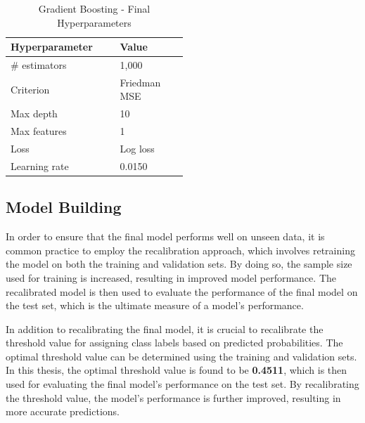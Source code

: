         
        \begin{table}[H]
            \small
            \setlength{\tabcolsep}{8pt}
            \renewcommand{\arraystretch}{1.3}
            \centering
                \caption[Gradient Boosting - Final Hyperparameters]{Gradient Boosting - Final Hyperparameters}\label{tab:finalhyp}
                \begin{tabular}{p{0.25\linewidth}p{0.25\linewidth}}
            \toprule
            \textbf{Hyperparameter} & \textbf{Value}\\
            \midrule
            \hline
            \# estimators & 1,000 \\
            Criterion & Friedman MSE \\
            Max depth & 10 \\
            Max features & 1 \\
            Loss & Log loss \\
            Learning rate &  0.0150 \\
            \hline
            \bottomrule
            \end{tabular}
            \vspace{0.7em}
        
            \vspace{-1em}
        \end{table}
        
        \subsection{Model Building}
        
        In order to ensure that the final model performs well on unseen data, it is common practice to employ the recalibration approach, which involves retraining the model on both the training and validation sets.
        By doing so, the sample size used for training is increased, resulting in improved model performance.
        The recalibrated model is then used to evaluate the performance of the final model on the test set, which is the ultimate measure of a model's performance.
        
        In addition to recalibrating the final model, it is crucial to recalibrate the threshold value for assigning class labels based on predicted probabilities. The optimal threshold value can be determined using the training and validation sets.
        In this thesis, the optimal threshold value is found to be \textbf{0.4511}, which is then used for evaluating the final model's performance on the test set.
        By recalibrating the threshold value, the model's performance is further improved, resulting in more accurate predictions.
        
